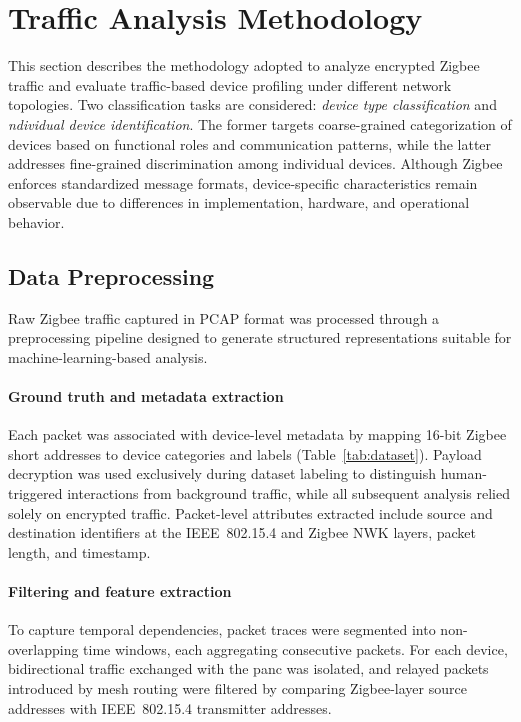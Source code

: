 \section{Traffic Analysis Methodology}
\label{sec:methodology}
This section describes the methodology adopted to analyze encrypted Zigbee traffic and evaluate traffic-based device profiling under different network topologies. Two classification tasks are considered: \textit{device type classification} and \textit{ndividual device identification}. The former targets coarse-grained categorization of devices based on functional roles and communication patterns, while the latter addresses fine-grained discrimination among individual devices. Although Zigbee enforces standardized message formats, device-specific characteristics remain observable due to differences in implementation, hardware, and operational behavior.

\subsection{Data Preprocessing}
\label{sec:data_pre}
Raw Zigbee traffic captured in PCAP format was processed through a preprocessing pipeline designed to generate structured representations suitable for machine-learning-based analysis.

\paragraph{Ground truth and metadata extraction}
Each packet was associated with device-level metadata by mapping 16-bit Zigbee short addresses to device categories and labels (Table~\ref{tab:dataset}). Payload decryption was used exclusively during dataset labeling to distinguish human-triggered interactions from background traffic, while all subsequent analysis relied solely on encrypted traffic. Packet-level attributes extracted include source and destination identifiers at the IEEE~802.15.4 and Zigbee NWK layers, packet length, and timestamp.

\paragraph{Filtering and feature extraction}
To capture temporal dependencies, packet traces were segmented into non-overlapping time windows, each aggregating consecutive packets. For each device, bidirectional traffic exchanged with the \gls*{panc} was isolated, and relayed packets introduced by mesh routing were filtered by comparing Zigbee-layer source addresses with IEEE~802.15.4 transmitter addresses.

